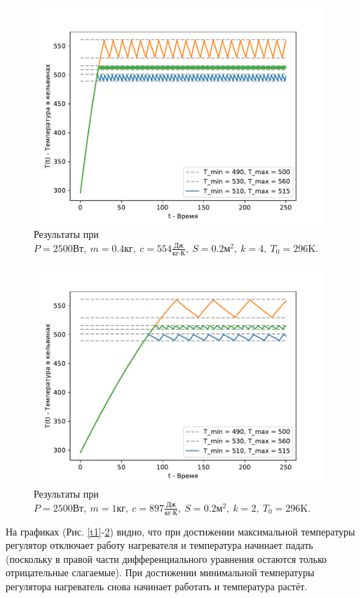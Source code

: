         \begin{figure}[H]
            \centering
            \includegraphics[width=11cm]{pictures/utug3.pdf}
            \caption{Результаты при $P = 2500 \text{Вт}, ~ m = 0.4 \text{кг}, ~ c = 554 \frac{\text{Дж}}{\text{кг} \cdot \text{К}}, ~ S = 0.2 \text{м}^2, ~ k = 4, ~ T_0 = 296 \text{K}$.} \label{t2}
        \end{figure}


        \begin{figure}[H]
            \centering
            \includegraphics[width=11cm]{pictures/utug4.pdf}
            \caption{Результаты при $P = 2500 \text{Вт}, ~ m = 1 \text{кг}, ~ c = 897 \frac{\text{Дж}}{\text{кг} \cdot \text{К}}, ~ S = 0.2 \text{м}^2, ~ k = 2, ~ T_0 = 296 \text{K}$.} \label{t3}
        \end{figure}

        На графиках (Рис. \ref{t1}-\ref{t3}) видно, что при достижении максимальной температуры регулятор отключает работу нагревателя и температура начинает падать (поскольку в правой части дифференциального уравнения остаются только отрицательные слагаемые). При достижении минимальной температуры регулятора нагреватель снова начинает работать и температура растёт.


